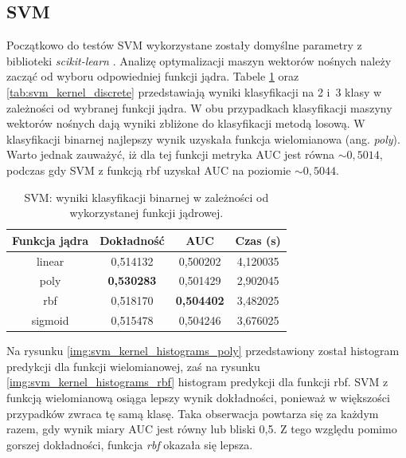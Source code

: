 \documentclass[a4paper, twoside, 11pt, openright]{article}
\begin{document}
\subsection{SVM}

Początkowo do testów SVM wykorzystane zostały domyślne parametry z biblioteki \textit{scikit-learn} \cite{bib:sklearnsvm}. Analizę optymalizacji maszyn wektorów nośnych należy zacząć od wyboru odpowiedniej funkcji jądra. Tabele \ref{tab:svm_kernel_binary} oraz \ref{tab:svm_kernel_discrete} przedstawiają wyniki klasyfikacji na 2 i~3 klasy w zależności od wybranej funkcji jądra. W obu przypadkach klasyfikacji maszyny wektorów nośnych dają wyniki zbliżone do klasyfikacji metodą losową. W klasyfikacji binarnej najlepszy wynik uzyskała funkcja wielomianowa (ang. \textit{poly}). Warto jednak zauważyć, iż dla tej funkcji metryka AUC jest równa $\sim 0,5014$, podczas gdy SVM z funkcją rbf uzyskał AUC na poziomie $\sim 0,5044$.

\begin{table}[H]
    \centering
    \begin{tabular}{|c|c|c|c|}
    \hline
        \textbf{Funkcja jądra} & \textbf{Dokładność} & \textbf{AUC} & \textbf{Czas (s)} \\ \hline
linear  &  0,514132 &  0,500202 &    4,120035 \\ \hline
poly    &  \textbf{0,530283} &  0,501429 &    2,902045 \\ \hline
rbf     &  0,518170 &  \textbf{0,504402} &    3,482025 \\ \hline
sigmoid &  0,515478 &  0,504246 &    3,676025 \\ \hline
    \end{tabular}
    \caption{SVM: wyniki klasyfikacji binarnej w zależności od wykorzystanej funkcji jądrowej.}
    \label{tab:svm_kernel_binary}
\end{table}

 Na rysunku \ref{img:svm_kernel_histograms_poly} przedstawiony został histogram predykcji dla funkcji wielomianowej, zaś na rysunku \ref{img:svm_kernel_histograms_rbf} histogram predykcji dla funkcji rbf. SVM z funkcją wielomianową osiąga lepszy wynik dokładności, ponieważ w większości przypadków zwraca tę samą klasę. Taka obserwacja powtarza się za każdym razem, gdy wynik miary AUC jest równy lub bliski 0,5. Z tego względu pomimo gorszej dokładności, funkcja \textit{rbf} okazała się lepsza.
\end{document}
